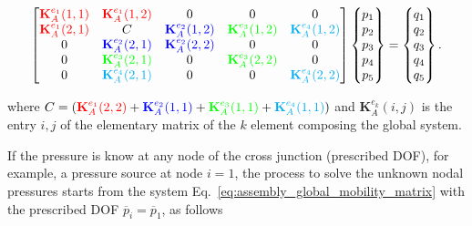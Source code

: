 \documentclass[12pt]{article}
\begin{document}
\begin{equation} \label{eq:assembly_global_mobility_matrix}
	\begin{bmatrix}
		\textcolor{red}{\mathbf{K}_{A}^{e_1}(1,1)} & \textcolor{red}{\mathbf{K}_{A}^{e_1}(1,2)} & 0 & 0 & 0 \\
		\textcolor{red}{\mathbf{K}_{A}^{e_1}(2,1)}  & C & \textcolor{blue}{\mathbf{K}_{A}^{e_2}(1,2)} & \textcolor{green}{\mathbf{K}_{A}^{e_3}(1,2)} & \textcolor{cyan}{\mathbf{K}_{A}^{e_4}(1,2)} \\
		0   &   \textcolor{blue}{\mathbf{K}_{A}^{e_2}(2,1)}   &   \textcolor{blue}{\mathbf{K}_{A}^{e_2}(2,2)}   & 0 & 0 \\
		0   &   \textcolor{green}{\mathbf{K}_{A}^{e_3}(2,1)}   &   0   &  \textcolor{green}{\mathbf{K}_{A}^{e_3}(2,2)}  &   0 \\
		0   &   \textcolor{cyan}{\mathbf{K}_{A}^{e_4}(2,1)}   &   0   &   0   &   \textcolor{cyan}{\mathbf{K}_{A}^{e_4}(2,2)}
	\end{bmatrix}
	\begin{Bmatrix}
		p_1 \\
		p_2 \\
		p_3 \\
		p_4 \\
		p_5 \\
	\end{Bmatrix}
	=
	\begin{Bmatrix}
		q_1 \\
		q_2 \\
		q_3 \\
		q_4 \\
		q_5 \\
	\end{Bmatrix}.
\end{equation}

\noindent where $C= \left( \textcolor{red}{\mathbf{K}_{A}^{e_1}(2,2)} + \textcolor{blue}{\mathbf{K}_{A}^{e_2}(1,1)} + \textcolor{green}{\mathbf{K}_{A}^{e_3}(1,1)} + \textcolor{cyan}{\mathbf{K}_{A}^{e_4}(1,1)} \right)$ and $\mathbf{K}_{A}^{e_k}(i,j)$ is the entry $i,j$ of the elementary matrix of the $k$ element composing the global system.

If the pressure is know at any node of the cross junction (prescribed \acrshort{DOF}), for example, a pressure source at node $i=1$, the process to solve the unknown nodal pressures starts from the system Eq.~\ref{eq:assembly_global_mobility_matrix} with the prescribed \acrshort{DOF} $\overline{p}_i = \overline{p}_1$, as follows
\end{document}
